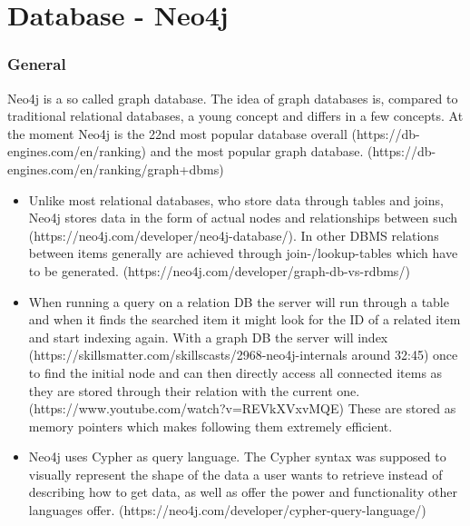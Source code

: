 \section{Database - Neo4j}
\subsubsection{General}
Neo4j is a so called graph database. The idea of graph databases is, compared to traditional relational databases, a young concept and differs in a few concepts. At the moment Neo4j is the 22nd most popular database overall (https://db-engines.com/en/ranking) and the most popular graph database. (https://db-engines.com/en/ranking/graph+dbms)

\begin{itemize}
\item Unlike most relational databases, who store data through tables and joins, Neo4j stores data in the form of actual nodes and relationships between such (https://neo4j.com/developer/neo4j-database/). In other DBMS relations between items generally are achieved through join-/lookup-tables which have to be generated. (https://neo4j.com/developer/graph-db-vs-rdbms/)

\item When running a query on a relation DB the server will run through a table and when it finds the searched item it might look for the ID of a related item and start indexing again. With a graph DB the server will index (https://skillsmatter.com/skillscasts/2968-neo4j-internals around 32:45) once to find the initial node and can then directly access all connected items as they are stored through their relation with the current one. (https://www.youtube.com/watch?v=REVkXVxvMQE) These are stored as memory pointers which makes following them extremely efficient.
\item Neo4j uses Cypher as query language. The Cypher syntax was supposed to visually represent the shape of the data a user wants to retrieve instead of describing how to get data, as well as offer the power and functionality other languages offer. (https://neo4j.com/developer/cypher-query-language/) 
\end{itemize}

